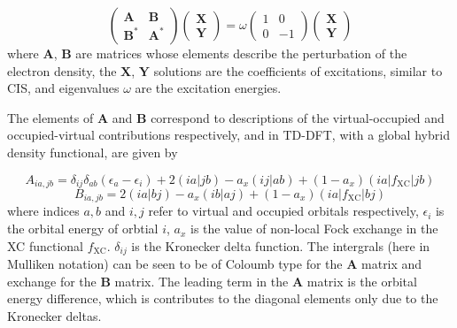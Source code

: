 \begin{equation}
    \begin{pmatrix}
        \mathbf{A}   & \mathbf{B} \\
        \mathbf{B}^\ast  & \mathbf{A}^\ast
    \end{pmatrix}
    \begin{pmatrix}
        \mathbf{X} \\
        \mathbf{Y}
    \end{pmatrix}
    = 
    \omega
    \begin{pmatrix}
        1 & 0 \\
        0 & -1
    \end{pmatrix}
    \begin{pmatrix}
        \mathbf{X} \\
        \mathbf{Y}
    \end{pmatrix}
\end{equation}
%
where $\mathbf{A}$, $\mathbf{B}$ are matrices whose elements describe the perturbation
of the electron density, the $\mathbf{X}$, $\mathbf{Y}$ solutions are the 
coefficients of excitations, similar to CIS, and eigenvalues $\omega$ are the 
excitation energies.

The elements of $\mathbf{A}$ and $\mathbf{B}$ correspond to descriptions of the
virtual-occupied and occupied-virtual contributions respectively, and in TD-DFT, 
with a global hybrid density functional, are given by

\begin{equation}
A_{ia,jb} = \delta_{ij} \delta_{ab} \left( \epsilon_a - \epsilon_i \right) + 2\left(ia|jb\right) - a_x\left(ij|ab\right) + (1- a_x)\left(ia|f_{\text{XC}}|jb\right)
\end{equation}
%
\begin{equation}
B_{ia,jb} = 2\left(ia|bj\right) - a_x\left(ib|aj\right) + (1- a_x)\left(ia|f_{\text{XC}}|bj\right)
\end{equation}
%
where indices $a,b$ and $i,j$ refer to virtual and occupied orbitals respectively,
$\epsilon_i$ is the orbital energy of orbtial $i$, $a_x$ is the value of non-local
Fock exchange in the XC functional $f_{\text{XC}}$. $\delta_{ij}$ is the Kronecker
delta function. The intergrals (here in Mulliken notation) can be seen to be of
Coloumb type for the $\mathbf{A}$ matrix and exchange for the $\mathbf{B}$ matrix. 
The leading term in the $\mathbf{A}$ matrix is the orbital energy difference,
which is contributes to the diagonal elements only due to the Kronecker deltas.

